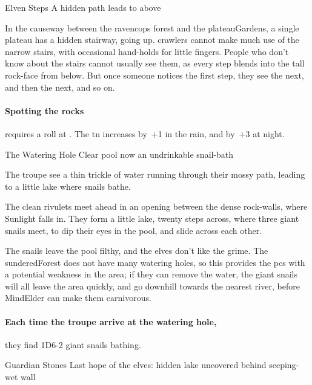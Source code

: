 
{Elven Steps}%
{A hidden path leads to  above}%
\label{hiddenStairs}

In the causeway between the \gls{ravencops} forest and the \gls{plateauGardens}, a single plateau has a hidden stairway, going up.
\Glspl{crawler} cannot make much use of the narrow stairs, with occasional hand-holds for little fingers.
People who don't know about the stairs cannot usually see them, as every step blends into the tall rock-face from below.
But once someone notices the first step, they see the next, and then the next, and so on.

\paragraph{Spotting the rocks}
requires a  roll at \tn[12].
The \gls{tn} increases by~+1 in the rain, and by~+3 at night.

{The Watering Hole}%
{Clear pool now an undrinkable snail-bath}%
\label{shadePool}

The troupe see a thin trickle of water running through their mossy path, leading to a little lake where snails bathe.

\begin{boxtext}
  The clean rivulets meet ahead in an opening between the dense rock-walls, where Sunlight falls in.
  They form a little lake, twenty \glspl{step} across, where three giant snails meet, to dip their eyes in the pool, and slide across each other.
\end{boxtext}

The snails leave the pool filthy, and the elves don't like the grime.
The \gls{sunderedForest} does not have many watering holes, so this provides the \glspl{pc} with a potential weakness in the area; if they can remove the  water, the giant snails will all leave the area quickly, and go downhill towards the nearest river, before \gls{MindElder} can make them carnivorous.

\paragraph{Each time the troupe arrive at the watering hole,}
they find 1D6-2 giant snails bathing.

{Guardian Stones}%
{Last hope of the elves: hidden lake uncovered behind seeping-wet wall}%
\label{shadeDamn}


